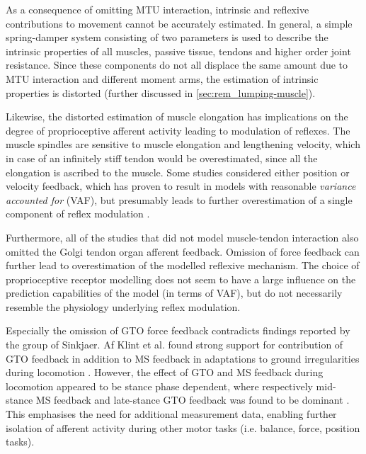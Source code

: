 As a consequence of omitting MTU interaction, intrinsic and reflexive contributions to movement cannot be accurately estimated.  
In general, a simple spring-damper system consisting of two parameters is used to describe the intrinsic properties of all muscles, passive tissue, tendons and higher order joint resistance. Since these components do not all displace the same amount due to MTU interaction and different moment arms, the estimation of intrinsic properties is distorted (further discussed in \autoref{sec:rem_lumping-muscle}). 

Likewise, the distorted estimation of muscle elongation has implications on the degree of proprioceptive afferent activity leading to modulation of reflexes. The muscle spindles are sensitive to muscle elongation and lengthening velocity, which in case of an infinitely stiff tendon would be overestimated, since all the elongation is ascribed to the muscle. Some studies considered either position or velocity feedback, which has proven to result in models with reasonable \textit{variance accounted for} (VAF), but presumably leads to further overestimation of a single component of reflex modulation \cite{maas_is_2009}. 

Furthermore, all of the studies that did not model muscle-tendon interaction also omitted the Golgi tendon organ afferent feedback. Omission of force feedback can further lead to overestimation of the modelled reflexive mechanism. The choice of proprioceptive receptor modelling does not seem to have a large influence on the prediction capabilities of the model (in terms of VAF), but do not necessarily resemble the physiology underlying reflex modulation. 

Especially the omission of GTO force feedback contradicts findings reported by the group of Sinkjaer. Af Klint et al. found strong support for contribution of GTO feedback in addition to MS feedback in adaptations to ground irregularities during locomotion \cite{klint_afferent_2009}. However, the effect of GTO and MS feedback during locomotion appeared to be stance phase dependent, where respectively mid-stance MS feedback and late-stance GTO feedback was found to be dominant \cite{grey_positive_2007, af_klint_sudden_2009}. This emphasises the need for additional measurement data, enabling further isolation of afferent activity during other motor tasks (i.e. balance, force, position tasks). 

